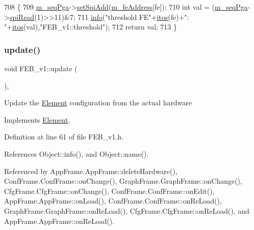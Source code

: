 \begin{DoxyCode}
708                              \{
709   \hyperlink{classFEB__v1_a6c7804ac86796f233a8393043adf2e77}{m\_seqPga}->\hyperlink{classSeqPGA_ac998ce3a6d9b5f2e88cc8393f8c1df53}{setSpiAdd}(\hyperlink{classFEB__v1_a4e1945c2d5b434125f375e9d0fc6d99f}{m\_feAddress}[fe]);
710   \textcolor{keywordtype}{int} val = (\hyperlink{classFEB__v1_a6c7804ac86796f233a8393043adf2e77}{m\_seqPga}->\hyperlink{classSeqPGA_ab3d0e5e5d4014bc7a92588a76b8713d4}{spiRead}(1)>>11)&7;
711   \hyperlink{classObject_a644fd329ea4cb85f54fa6846484b84a8}{info}(\textcolor{stringliteral}{"threshold FE"}+\hyperlink{Tools_8h_af330027dbdafb9a30768b3613c553e60}{itos}(fe)+\textcolor{stringliteral}{": "}+\hyperlink{Tools_8h_af330027dbdafb9a30768b3613c553e60}{itos}(val),\textcolor{stringliteral}{"FEB\_v1::threshold"});
712   \textcolor{keywordflow}{return} val;
713 \}
\end{DoxyCode}
\mbox{\label{classFEB__v1_a96ad348b7be37686998c0eaa7fd2e83e}} 
\subsubsection{\texorpdfstring{update()}{update()}}
{\footnotesize\ttfamily void F\+E\+B\+\_\+v1\+::update (\begin{DoxyParamCaption}{ }\end{DoxyParamCaption})\hspace{0.3cm}{\ttfamily [inline]}, {\ttfamily [virtual]}}

Update the \hyperlink{classElement}{Element} configuration from the actual hardware 

Implements \hyperlink{classElement_a4e6c83efae95616ebddd03c793a26661}{Element}.



Definition at line 61 of file F\+E\+B\+\_\+v1.\+h.



References Object\+::info(), and Object\+::name().



Referenced by App\+Frame.\+App\+Frame\+::delete\+Hardware(), Conf\+Frame.\+Conf\+Frame\+::on\+Change(), Graph\+Frame.\+Graph\+Frame\+::on\+Change(), Cfg\+Frame.\+Cfg\+Frame\+::on\+Change(), Conf\+Frame.\+Conf\+Frame\+::on\+Edit(), App\+Frame.\+App\+Frame\+::on\+Load(), Conf\+Frame.\+Conf\+Frame\+::on\+Re\+Load(), Graph\+Frame.\+Graph\+Frame\+::on\+Re\+Load(), Cfg\+Frame.\+Cfg\+Frame\+::on\+Re\+Load(), and App\+Frame.\+App\+Frame\+::on\+Re\+Load().


